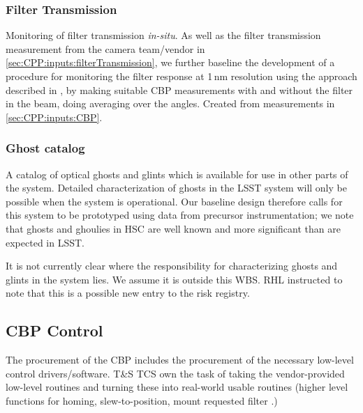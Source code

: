 \subsubsection{Filter Transmission}\label{sec:CPP:output:filterTransmission}
Monitoring of filter transmission \emph{in-situ}. As well as the filter transmission measurement from the camera team/vendor in \secsymbol\ref{sec:CPP:inputs:filterTransmission}, we further baseline the development of a procedure for monitoring the filter response at 1\,nm resolution using the approach described in \cite{Lupton15}, \ie by making suitable CBP measurements with and without the filter in the beam, doing averaging over the angles.
\alg Created from measurements in \secsymbol\ref{sec:CPP:inputs:CBP}.


\subsubsection{Ghost catalog}\label{sec:CPP:output:GhostCatalog}
A catalog of optical ghosts and glints which is available for use in other parts of the system. Detailed characterization of ghosts in the LSST system will only be possible when the system is operational. Our baseline design therefore calls for this system to be prototyped using data from precursor instrumentation; we note that ghosts and ghoulies in \eg HSC are well known and more significant than are expected in LSST.
\begin{note}
It is not currently clear where the responsibility for characterizing ghosts and glints in the system lies. We assume it is outside this WBS. RHL instructed to note that this is a possible new entry to the risk registry.
\end{note}





\subsection{CBP Control}\label{sec:CPP:CBP_control}
The procurement of the CBP includes the procurement of the necessary low-level control drivers/software. T\&S TCS own the task of taking the vendor-provided low-level routines and turning these into real-world usable routines (higher level functions for \eg homing, slew-to-position, mount requested filter \etc.)


